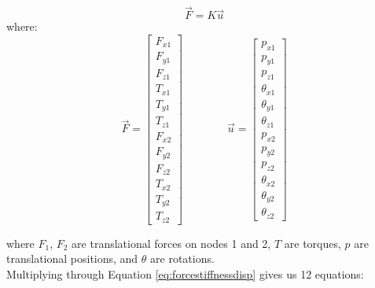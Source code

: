 { \begin{equation} \label{eq:forcestiffnessdisp} \vec{F} = K\vec{u} \end{equation}
where:
\[ \vec{F} =  \left[ \begin{array}{ccc}
F_{x1}\\
F_{y1}\\
F_{z1}\\
T_{x1}\\
T_{y1}\\
T_{z1}\\
F_{x2}\\
F_{y2}\\
F_{z2}\\
T_{x2}\\
T_{y2}\\
T_{z2}
 \end{array} \right]  \qquad \qquad  
 \vec{u} =  \left[ \begin{array}{ccc}
p_{x1}\\
p_{y1}\\
p_{z1}\\
\theta_{x1}\\
\theta_{y1}\\
\theta_{z1}\\
p_{x2}\\
p_{y2}\\
p_{z2}\\
\theta_{x2}\\
\theta_{y2}\\
\theta_{z2}
 \end{array} \right]
 \]
 
where $F_1$, $F_2$ are translational forces on nodes 1 and 2, $T$ are torques, $p$ are translational positions, and $\theta$ are rotations.\\

Multiplying through Equation \ref{eq:forcestiffnessdisp} gives us 12 equations:

}
